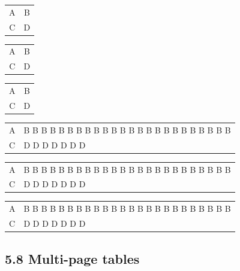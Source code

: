 \documentclass{article}
\begin{document}
 \begin{center}
 \begin{tabular}{cc}
 \hline
 A & B\\
 C & D\\
 \hline
 \end{tabular}
 \end{center}
 \begin{center}
 \begin{tabular*}{.5\textwidth}{@{\extracolsep{\fill}}cc@{}}
 \hline
 A & B\\
 C & D\\
 \hline
 \end{tabular*}
 \end{center}
 \begin{center}
 \begin{tabular*}{\textwidth}{@{\extracolsep{\fill}}cc@{}}
 \hline
 A & B\\
 C & D\\
 \hline
 \end{tabular*}
 \end{center}

\vspace{2em}

 \begin{center}
 \begin{tabular}{lp{2cm}}
 \hline
 A & B B B B B B B B B B B B B B B B B B B B B B B B\\
 C & D D D D D D D\\
 \hline
 \end{tabular}
 \end{center}
 \begin{center}
 \begin{tabularx}{.5\textwidth}{lX}
 \hline
 A & B B B B B B B B B B B B B B B B B B B B B B B B\\
 C & D D D D D D D\\
 \hline
 \end{tabularx}
\end{center}
 \begin{center}
 \begin{tabularx}{\textwidth}{lX}
 \hline
 A & B B B B B B B B B B B B B B B B B B B B B B B B\\
 C & D D D D D D D\\
 \hline
 \end{tabularx}
 \end{center}


\vspace{2em}
\subsection*{ 5.8 Multi-page tables}
\end{document}
